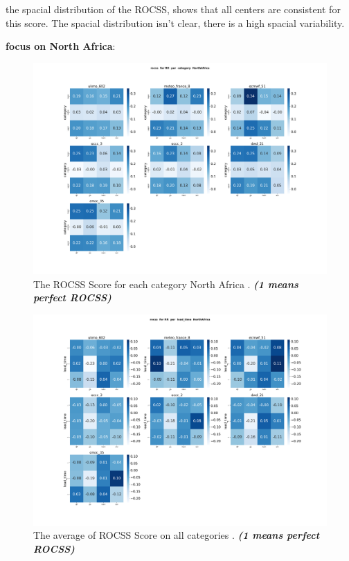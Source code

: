 the spacial distribution of the ROCSS, shows that all centers are consistent for this score. The spacial distribution isn't clear, there is a high spacial variability.

\vspace{1.5cm}
\textbf{focus on North Africa}:

\begin{figure}[H]
    \centering
    \includegraphics[scale=0.25]{plots/prob/rocss/rocss_RR_category_NorthAfrica.png}
    \caption{The ROCSS Score for each category North Africa . \textbf{\textit{(1 means perfect ROCSS)}}}
\end{figure}


\begin{figure}[H]
    \centering
    \includegraphics[scale=0.25]{plots/prob/rocss/rocss_RR_lead_time_NorthAfrica.png}
    \caption{The average of  ROCSS Score on all categories    . \textbf{\textit{(1 means perfect ROCSS)}}}
\end{figure}


